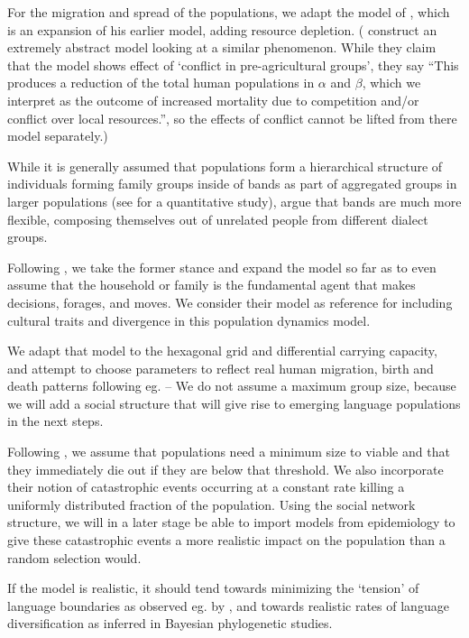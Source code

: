 \documentclass[a4paper,12pt]{scrartcl}
\begin{document}
For the migration and spread of the populations, we adapt the model of
\textcite[scenario 4]{crema2015modelling}, which is an expansion of his earlier
\citeyear{crema2014simulation} model, adding resource depletion.
(\textcite{gargano2017largescale} construct an extremely abstract model looking at a
similar phenomenon. While they claim that the model shows effect of ‘conflict in
pre-agricultural groups’, they say “This produces a reduction of the total human
populations in $\alpha$ and $\beta$, which we interpret as the outcome of increased mortality
due to competition and/or conflict over local resources.”, so the effects of
conflict cannot be lifted from there model separately.)

While it is generally
assumed that populations form a hierarchical structure of individuals forming
family groups inside of bands as part of aggregated groups in larger populations
(see \textcite{hamilton2007complex} for a quantitative study),
\textcite{bird2019variability} argue that bands are much more flexible,
composing themselves out of unrelated people from different dialect groups.

Following \textcite{delcastillo2013modeling}, we take the former stance and
expand the model so far as to even assume that the household or family is the
fundamental agent that makes decisions, forages, and moves. We consider their
model as reference for including cultural traits and divergence in this
population dynamics model.

We adapt that model to the hexagonal grid and differential carrying capacity,
and attempt to choose parameters to reflect real human migration, birth and
death patterns following eg. \textcite{hamilton2007complex} – We do not assume a
maximum group size, because we will add a social structure that will give rise
to emerging language populations in the next steps.

Following \textcite{hamilton2018stochastic}, we assume that populations need a
minimum size to viable and that they immediately die out if they are below that
threshold. We also incorporate their notion of catastrophic events occurring at
a constant rate killing a uniformly distributed fraction of the population.
Using the social network structure, we will in a later stage be able to import
models from epidemiology to give these catastrophic events a more realistic
impact on the population than a random selection would.

If the model is realistic, it should tend towards minimizing the ‘tension’ of
language boundaries as observed eg. by \textcite{burridge2017spatial}, and
towards realistic rates of language diversification as inferred in Bayesian
phylogenetic studies.

\printbibliography
\end{document}
